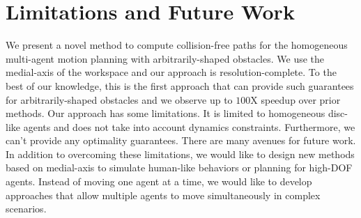 \section{ Limitations and Future Work}

We present a novel method to compute collision-free paths for the homogeneous multi-agent motion planning with arbitrarily-shaped obstacles. We use the medial-axis of the workspace and our approach is resolution-complete. To the best of our knowledge, this is the first approach that can provide such guarantees for arbitrarily-shaped obstacles and we observe up to $100$X speedup over prior methods.
Our approach has some limitations. It is limited to homogeneous disc-like agents and does not take into account dynamics constraints. Furthermore, we can't provide any optimality guarantees.
There are many avenues for future work. In addition to overcoming
these limitations, we would like to design new methods based on medial-axis to simulate human-like behaviors or planning for high-DOF agents. Instead of moving one agent at a time, we would like to develop approaches that allow multiple agents to move simultaneously in complex scenarios.
